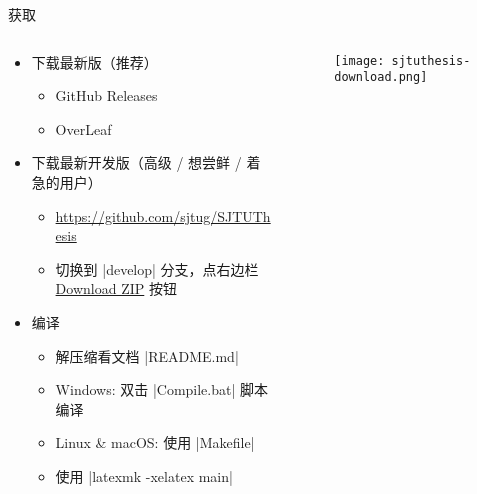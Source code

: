 \begin{frame}[fragile]{获取\SJTUThesis{}}
  \begin{columns}
    \begin{column}{.65\textwidth}
    \begin{itemize}
      \item 下载最新版（推荐）
        \begin{itemize}
          \item GitHub Releases 
          \item OverLeaf 
        \end{itemize}
      \item 下载最新开发版（高级 / 想尝鲜 / 着急的用户）
        \begin{itemize}
          \item \url{https://github.com/sjtug/SJTUThesis}
          \item 切换到 |develop| 分支，点右边栏
            \href{https://github.com/sjtug/SJTUThesis/archive/dev.zip}%
            {Download ZIP} 按钮
        \end{itemize}
      \item 编译
        \begin{itemize}
          \item 解压缩看文档 |README.md|
          \item Windows: 双击 |Compile.bat| 脚本编译
          \item Linux \& macOS: 使用 |Makefile|
          \item 使用 |latexmk -xelatex main|
        \end{itemize}
    \end{itemize}
    \end{column}
    \begin{column}{.25\textwidth}
      \begin{figure}[htbp]
        \centering
        \texttt{[image: sjtuthesis-download.png]}
      \end{figure}
      \vfill
    \end{column}
  \end{columns}
\end{frame}

